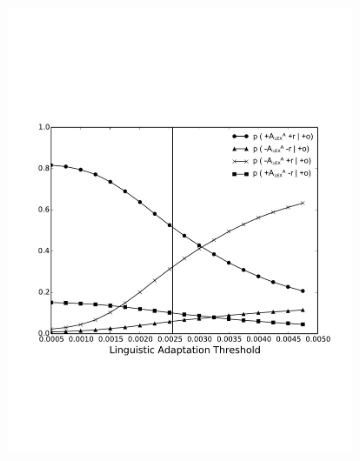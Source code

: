 \documentclass[man,biblatex,floatsintext]{apa6}
\begin{document}
\begin{figure}[!htb]

\begin{subfigure}{.5\textwidth}
  \centering
  \includegraphics[width=\linewidth]{Figures/LexAposi_new_rob_New_Enlarge.pdf}
  \caption{\label{fig:ProbLexPoso}}
\end{subfigure}%
\begin{subfigure}{.5\textwidth}
  \centering

\end{subfigure}
\end{figure}
\end{document}
